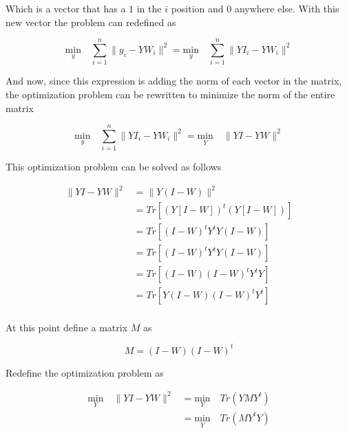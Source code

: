 \documentclass[12pt,journal]{IEEEtran}
\begin{document}
    Which is a vector that has a $1$ in the $i$ position and $0$ anywhere else.
    With this new vector the problem can redefined as

    \begin{equation*}
            \underset{y}{\text{min}} \quad \sum_{i=1}^n \lVert y_i - Y W_i \rVert^2
            =
            \underset{y}{\text{min}} \quad \sum_{i=1}^n \lVert YI_i - Y W_i \rVert^2
    \end{equation*}

    \vspace{0.25cm}

    And now, since this expression is adding the norm of each vector in the
    matrix, the optimization problem can be rewritten to minimize the norm of
    the entire matrix

    \begin{equation*}
            \underset{y}{\text{min}} \quad \sum_{i=1}^n \lVert YI_i - Y W_i \rVert^2
            =
            \underset{Y}{\text{min}} \quad \lVert YI - Y W \rVert^2
    \end{equation*}

    This optimization problem can be solved as follows

    \begin{equation*}
        \begin{aligned}
            \lVert Y I - Y W \rVert^2 &= \lVert Y (I - W) \rVert^2\\
            &= Tr[(Y [I-W])^t (Y [I-W])]\\
            &= Tr[(I-W)^t Y^t Y (I-W)]\\
            &= Tr[(I-W)^t Y^t Y (I-W)]\\
            &= Tr[(I-W) (I-W)^t Y^t Y]\\
            &= Tr[Y (I-W) (I-W)^t Y^t]\\
        \end{aligned}
    \end{equation*}

    At this point define a matrix $M$ as

    \begin{equation*}
        M = (I-W) (I-W)^t
    \end{equation*}

    Redefine the optimization problem as

    \begin{equation*}
        \begin{aligned}
            \underset{Y}{\text{min}} \quad \lVert YI - Y W \rVert^2
            &=
            \underset{Y}{\text{min}} \quad Tr(Y M Y^t)\\
            &=
            \underset{Y}{\text{min}} \quad Tr(M Y^t Y)
        \end{aligned}
    \end{equation*}
\end{document}
